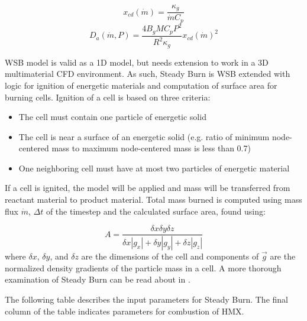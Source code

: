 \begin{equation}
x_{cd} \left(\dot{m}\right)=\frac{\kappa_g}{\displaystyle \dot{m} C_p}
\label{WSB4}
\end{equation}
\begin{equation}
D_a\left(\dot{m},P\right) = \frac{4 B_g M C_p P^2}{\displaystyle R^2 \kappa_g} x_{cd}\left(\dot{m}\right)^2
\label{WSB5}
\end{equation}

WSB model is valid as a 1D model, but needs extension to work in a 3D multimaterial CFD environment.  As such, Steady Burn is WSB extended with logic for ignition of energetic materials and computation of surface area for burning cells.  Ignition of a cell is based on three criteria: 
\begin{itemize}
  \item The cell must contain one particle of energetic solid
  \item The cell is near a surface of an energetic solid (e.g. ratio of minimum node-centered mass to maximum node-centered mass is less than 0.7)
  \item One neighboring cell must have at most two particles of energetic material
\end{itemize}
If a cell is ignited, the model will be applied and mass will be transferred from reactant material to product material.  Total mass burned is computed using mass flux $\dot{m}$, $\Delta t$ of the timestep and the calculated surface area, found using:

\begin{equation}
A=\frac{\delta x \delta y \delta z}{\displaystyle \delta x |g_x| + \delta y |g_y| + \delta z |g_z|}
\label{WSB6}
\end{equation} where $\delta x$, $\delta y$, and $\delta z$ are the dimensions of the cell and components of $\overrightarrow{g}$ are the normalized density gradients of the particle mass in a cell.  A more thorough examination of Steady Burn can be read about in \cite{ref:wighteddings}.

The following table describes the input parameters for Steady Burn.  The final column of the table indicates parameters for combustion of HMX.  

